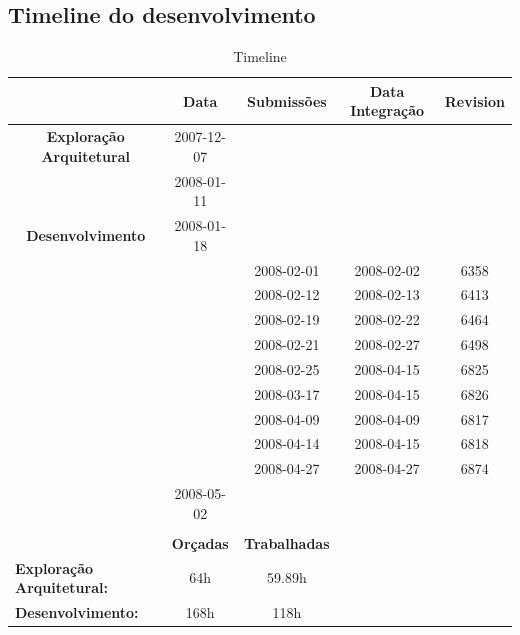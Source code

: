 \subsection{Timeline do desenvolvimento}
\begin{table}[htbp]
\begin{tabular}{|l|c|c|c|c|}
\hline
 & \textbf{Data} & \textbf{Submissões} & \textbf{Data Integração} & \textbf{Revision} \\ \hline
\multicolumn{ 1}{|c|}{\textbf{Exploração Arquitetural}} & 2007-12-07 &  &  &  \\ \cline{ 2- 5}
\multicolumn{ 1}{|l|}{} & 2008-01-11 &  &  &  \\ \hline
\multicolumn{ 1}{|c|}{\textbf{Desenvolvimento}} & 2008-01-18 &  &  &  \\ \cline{ 2- 5}
\multicolumn{ 1}{|l|}{} &  & 2008-02-01 & 2008-02-02 & 6358 \\ \cline{ 2- 5}
\multicolumn{ 1}{|l|}{} &  & 2008-02-12 & 2008-02-13 & 6413 \\ \cline{ 2- 5}
\multicolumn{ 1}{|l|}{} &  & 2008-02-19 & 2008-02-22 & 6464 \\ \cline{ 2- 5}
\multicolumn{ 1}{|l|}{} &  & 2008-02-21 & 2008-02-27 & 6498 \\ \cline{ 2- 5}
\multicolumn{ 1}{|l|}{} &  & 2008-02-25 & 2008-04-15 & 6825 \\ \cline{ 2- 5}
\multicolumn{ 1}{|l|}{} &  & 2008-03-17 & 2008-04-15 & 6826 \\ \cline{ 2- 5}
\multicolumn{ 1}{|l|}{} &  & 2008-04-09 & 2008-04-09 & 6817 \\ \cline{ 2- 5}
\multicolumn{ 1}{|l|}{} &  & 2008-04-14 & 2008-04-15 & 6818 \\ \cline{ 2- 5}
\multicolumn{ 1}{|l|}{} &  & 2008-04-27 & 2008-04-27 & 6874 \\ \cline{ 2- 5}
\multicolumn{ 1}{|l|}{} & 2008-05-02 &  &  &  \\ \hline
 &  &  &  &  \\ \hline
 & \textbf{Orçadas} & \textbf{Trabalhadas} &  &  \\ \hline
\textbf{Exploração Arquitetural:} & 64h & 59.89h &  &  \\ \hline
\textbf{Desenvolvimento:} & 168h & 118h &  &  \\ \hline
\end{tabular}
\caption{Timeline}
\label{Timeline}
\end{table}
